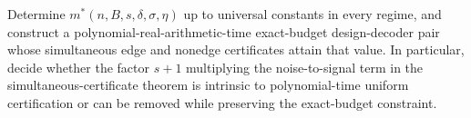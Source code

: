 Determine \(m^*(n,B,s,\delta,\sigma,\eta)\) up to universal constants in every regime, and construct a polynomial-real-arithmetic-time exact-budget design-decoder pair whose simultaneous edge and nonedge certificates attain that value. In particular, decide whether the factor \(s+1\) multiplying the noise-to-signal term in the simultaneous-certificate theorem is intrinsic to polynomial-time uniform certification or can be removed while preserving the exact-budget constraint.
